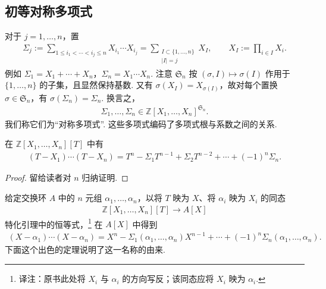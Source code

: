 \subsection{初等对称多项式}\label{sec:galois-2-9-2}
对于 $j=1,\ldots,n$，置
\begin{align*}
\Sigma_j:=\sum_{1\leq i_1<\cdots<i_j\leq n}X_{i_1}\cdots X_{i_j}=\sum_{\substack{I\subset\{1,\ldots,n\}\\|I|=j}}X_I,\qquad X_I:=\prod_{i\in I}X_i.
\end{align*}
例如 $\Sigma_1=X_1+\cdots+X_n$，$\Sigma_n=X_1\cdots X_n$. 注意 $\mathfrak S_n$ 按 $(\sigma,I)\mapsto\sigma(I)$ 作用于 $\{1,\ldots,n\}$ 的子集，且显然保持基数. 又有 $\sigma(X_I)=X_{\sigma(I)}$，故对每个置换 $\sigma\in\mathfrak S_n$，有 $\sigma(\Sigma_n)=\Sigma_n$. 换言之，
\begin{align*}
\Sigma_1,\ldots,\Sigma_n\in\mathbb Z[X_1,\ldots,X_n]^{\mathfrak S_n}.
\end{align*}
我们称它们为``对称多项式''. 这些多项式编码了多项式根与系数之间的关系.
\begin{lemma*}在 $\mathbb Z[X_1,\ldots,X_n][T]$ 中有
\begin{align*}
(T-X_1)\cdots(T-X_n)=T^n-\Sigma_1T^{n-1}+\Sigma_2T^{n-2}+\cdots+(-1)^n\Sigma_n.
\end{align*}
\end{lemma*}
\begin{proof}留给读者对 $n$ 归纳证明.\end{proof}
给定交换环 $A$ 中的 $n$ 元组 $\alpha_1,\ldots,\alpha_n$，以将 $T$ 映为 $X$、将 $\alpha_i$ 映为 $X_i$ 的同态
\begin{align*}\mathbb Z[X_1,\ldots,X_n][T]\to A[X]\end{align*}
特化引理中的恒等式，\footnote{译注：原书此处将 $X_i$ 与 $\alpha_i$ 的方向写反；该同态应将 $X_i$ 映为 $\alpha_i$.} 在 $A[X]$ 中得到
\begin{align*}
(X-\alpha_1)\cdots(X-\alpha_n)=X^n-\Sigma_1(\alpha_1,\ldots,\alpha_n)X^{n-1}+\cdots+(-1)^n\Sigma_n(\alpha_1,\ldots,\alpha_n).
\end{align*}
下面这个出色的定理说明了这一名称的由来.
